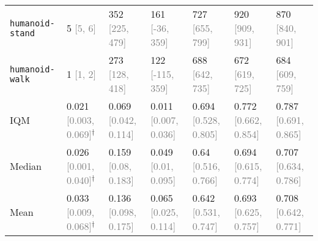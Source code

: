 \begin{table}[h]
{{\begin{tabular}{lllllll}
\texttt{humanoid-stand} & 5 \textcolor{gray}{[5, 6]} & 352 \textcolor{gray}{[225, 479]} & 161 \textcolor{gray}{[-36, 359]} & 727 \textcolor{gray}{[655, 799]} & 920 \textcolor{gray}{[909, 931]} & 870 \textcolor{gray}{[840, 901]} \\
\texttt{humanoid-walk} & 1 \textcolor{gray}{[1, 2]} & 273 \textcolor{gray}{[128, 418]} & 122 \textcolor{gray}{[-115, 359]} & 688 \textcolor{gray}{[642, 735]} & 672 \textcolor{gray}{[619, 725]} & 684 \textcolor{gray}{[609, 759]} \\ \midrule
IQM & 0.021 \textcolor{gray}{[0.003, 0.069]}$^\dagger$ & 0.069 \textcolor{gray}{[0.042, 0.114]} & 0.011 \textcolor{gray}{[0.007, 0.036]} & 0.694 \textcolor{gray}{[0.528, 0.805]} & 0.772 \textcolor{gray}{[0.662, 0.854]} & 0.787 \textcolor{gray}{[0.691, 0.865]} \\
Median & 0.026 \textcolor{gray}{[0.001, 0.040]}$^\dagger$ & 0.159 \textcolor{gray}{[0.08, 0.183]} & 0.049 \textcolor{gray}{[0.01, 0.095]} & 0.64 \textcolor{gray}{[0.516, 0.766]} & 0.694 \textcolor{gray}{[0.615, 0.774]} & 0.707 \textcolor{gray}{[0.634, 0.786]} \\
Mean & 0.033 \textcolor{gray}{[0.009, 0.068]}$^\dagger$ & 0.136 \textcolor{gray}{[0.098, 0.175]} & 0.065 \textcolor{gray}{[0.025, 0.114]} & 0.642 \textcolor{gray}{[0.531, 0.747]} & 0.693 \textcolor{gray}{[0.625, 0.757]} & 0.708 \textcolor{gray}{[0.642, 0.771]} \\
\bottomrule
\end{tabular}
}}
\end{table}
